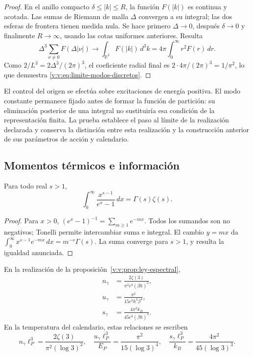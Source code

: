 \begin{proof}
En el anillo compacto \(\delta\leq|k|\leq R\), la función
\(F(|k|)\) es continua y acotada. Las sumas de Riemann de malla
\(\Delta\) convergen a su integral; las dos esferas de frontera
tienen medida nula. Se hace primero \(\Delta\to0\), después
\(\delta\to0\) y finalmente \(R\to\infty\), usando las cotas
uniformes anteriores. Resulta
\[
 \Delta^3\sum_{\nu\ne0}F(\Delta|\nu|)
 \longrightarrow \int_{\mathbb R^3}F(|k|)\,d^3k
 =4\pi\int_0^\infty r^2F(r)\,dr.
\]
Como \(2/L^3=2\Delta^3/(2\pi)^3\), el coeficiente radial final
es \(2\cdot4\pi/(2\pi)^3=1/\pi^2\), lo que demuestra
\eqref{v:v:eq:limite-modos-discretos}.
\end{proof}

El control del origen se efectúa sobre excitaciones de energía positiva.
El modo constante permanece fijado antes de formar la función de partición:
su eliminación posterior de una integral no sustituiría esa condición de
la representación finita. La prueba establece el paso al límite de la
realización declarada y conserva la distinción entre esta realización y
la construcción anterior de sus parámetros de acción y calendario.



\subsection{Momentos térmicos e información}

\begin{lemma}
\label{v:v:lem:momento-bosonico}
Para todo real \(s>1\),
\begin{equation}
 \int_0^\infty\frac{x^{s-1}}{e^x-1}\,dx
 =\Gamma(s)\zeta(s).
 \label{v:v:eq:momento-bosonico}
\end{equation}
\end{lemma}
\begin{proof}
Para \(x>0\), \((e^x-1)^{-1}=\sum_{m\geq1}e^{-mx}\).
Todos los sumandos son no negativos; Tonelli permite intercambiar suma
e integral. El cambio \(y=mx\) da
\(\int_0^\infty x^{s-1}e^{-mx}\,dx=m^{-s}\Gamma(s)\).
La suma converge para \(s>1\), y resulta la igualdad anunciada.
\end{proof}

\begin{proposition}
\label{v:v:prop:densidades-termicas}
En la realización de la proposición~\ref{v:v:prop:ley-espectral},
\begin{align}
 n_\gamma&=\frac{2\zeta(3)}{\pi^2c^3(\beta\hbar)^3},\\
 u_\gamma&=\frac{\pi^2}{15c^3\hbar^3\beta^4},\\
 s_\gamma&=\frac{4\pi^2 k_B}{45c^3(\beta\hbar)^3}.
 \label{v:v:eq:densidades-termicas}
\end{align}
En la temperatura del calendario, estas relaciones se escriben
\begin{equation}
 n_\gamma\ell_P^3=\frac{2\zeta(3)}{\pi^2(\log3)^3},\quad
 \frac{u_\gamma\ell_P^3}{E_P}=\frac{\pi^2}{15(\log3)^4},\quad
 \frac{s_\gamma\ell_P^3}{k_B}=\frac{4\pi^2}{45(\log3)^3}.
 \label{v:v:eq:densidades-calendario}
\end{equation}
\end{proposition}

